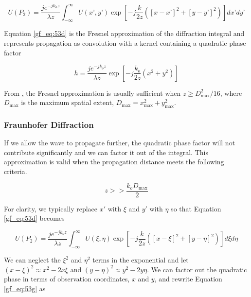 \begin{equation}
\boxed{U(P_2) =\frac{je^{-jk_oz}}{\lambda z}\int_{-\infty}^{\infty} U(x’,y’)\exp\left[-j \frac{k}{2z}\left([x-x’]^2 + [y-y’]^2 \right) \right]dx’ dy’}
\label{gf_eq:53d}
\end{equation}
\renewcommand{\baselinestretch}{2} \small\normalsize

Equation \ref{gf_eq:53d} is the Fresnel approximation of the diffraction integral and represents propagation as convolution with a kernel containing a quadratic phase factor

\begin{equation}
h = \frac{je^{-jk_o z}}{\lambda z}\exp\left[-j\frac{k_o}{2z}\left(x^2 + y^2 \right) \right]
\label{gf_eq:53e}
\end{equation}
\renewcommand{\baselinestretch}{2} \small\normalsize

From \cite{goodman_fourier}, the Fresnel approximation is usually sufficient when $z\geq D_{\text{max}}^2/16$, where $D_{\text{max}}$ is the maximum spatial extent, $D_{\text{max}} = x_{\text{max}}^2 + y_{\text{max}}^2$. 

\subsubsection{Fraunhofer Diffraction}
If we allow the wave to propagate further, the quadratic phase factor will not contribute significantly and we can factor it out of the integral. This approximation is valid when the propagation distance meets the following criteria.

\begin{equation}
z >> \frac{k_oD_{\text{max}}}{2}
\label{gf_eq:53f}
\end{equation}
\renewcommand{\baselinestretch}{2} \small\normalsize

For clarity, we typically replace $x'$ with $\xi$ and $y'$ with $\eta$ so that Equation \ref{gf_eq:53d} becomes

\begin{equation}
U(P_2) =\frac{je^{-jk_oz}}{\lambda z}\int_{-\infty}^{\infty} U(\xi,\eta)\exp\left[-j \frac{k}{2z}\left([x-\xi]^2 + [y-\eta]^2 \right) \right]d\xi d\eta
\label{gf_eq:53g}
\end{equation}
\renewcommand{\baselinestretch}{2} \small\normalsize

We can neglect the $\xi^2$ and $\eta^2$ terms in the exponential and let $(x-\xi)^2 \approx x^2-2x\xi$ and $(y-\eta)^2\approx y^2-2y\eta$. We can factor out the quadratic phase in terms of observation coordinates, $x$ and $y$, and rewrite Equation \ref{gf_eq:53g} as

